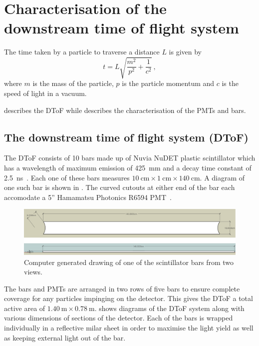 \chapter{Characterisation of the downstream time of flight system}
\label{sec:hptpc_dtof_characterisation}

The time taken by a particle to traverse a distance $L$ is given by
\begin{equation}
  t = L \sqrt{ \frac{m^{2}}{p^{2}} + \frac{1}{c^{2}} } \, ,
\end{equation}
where $m$ is the mass of the particle, $p$ is the particle momentum and $c$ is the speed of light in a vacuum.

 describes the DToF while  describes the characterisation of the PMTs and bars.

\section{The downstream time of flight system (DToF)}
\label{sec:hptpc_dtof_characterisation:dtof}

The DToF consists of 10 bars made up of Nuvia NuDET plastic scintillator which has a wavelength of maximum emission of \SI{425}{\milli\metre} and a decay time constant of \SI{2.5}{\nano\second}~\cite{nuvia}.
Each one of these bars measures $\SI{10}{\centi\metre} \times \SI{1}{\centi\metre} \times \SI{140}{\centi\metre}$.
A diagram of one such bar is shown in .
The curved cutouts at either end of the bar each accomodate a 5'' Hamamatsu Photonics R6594 PMT~\cite{hamamatsu}.

\begin{figure}
  \centering
  \includegraphics[width=.8\linewidth]{files/figures/hptpc_dtof_characterisation/barDiag}
  \caption[HPTPC DToF bar diagram]{Computer generated drawing of one of the scintillator bars from two views.}
  \label{fig:barDiag}
\end{figure}

The bars and PMTs are arranged in two rows of five bars to ensure complete coverage for any particles impinging on the detector.
This gives the DToF a total active area of $\SI{1.40}{\metre} \times \SI{0.78}{\metre}$.
 shows diagrams of the DToF system along with various dimensions of sections of the detector.
Each of the bars is wrapped individually in a reflective milar sheet in order to maximise the light yield as well as keeping external light out of the bar.

